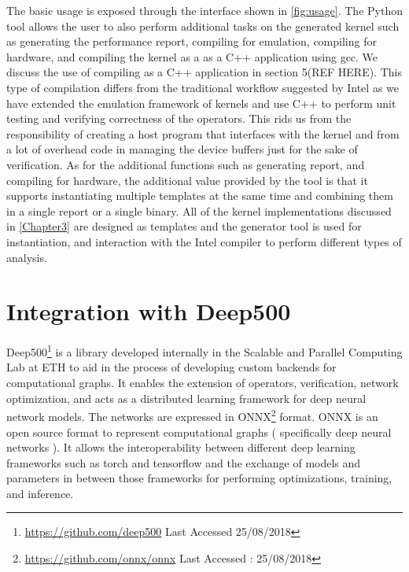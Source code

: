 The basic usage is exposed through the interface shown in \ref{fig:usage}. The Python tool allows the user to also perform additional tasks on the generated kernel such as generating the performance report, compiling for emulation, compiling for hardware, and compiling the kernel as a as a C++ application using gcc. We discuss the use of compiling   as a C++ application in section 5(REF HERE). This type of compilation differs from the traditional workflow suggested by Intel as we have extended the emulation framework of kernels and use C++ to perform unit testing and verifying correctness of the operators. This rids us from the responsibility of creating a host program that interfaces with the kernel and from a lot of overhead code in managing the device buffers just for the sake of verification. 
As for the additional functions such as generating report, and compiling for hardware, the additional value provided by the tool is that it supports instantiating multiple templates at the same time and combining them in a single report or a single binary. All of the kernel implementations discussed in \ref{Chapter3} are designed as templates and the generator tool is used for instantiation, and interaction with the Intel compiler to perform different types of analysis.

\section{Integration with Deep500}

Deep500\footnote{\url{https://github.com/deep500} Last Accessed 25/08/2018} is a library developed internally in the Scalable and Parallel Computing Lab at ETH to aid in the process of developing custom backends for computational graphs. It enables the extension of operators, verification, network optimization, and acts as a distributed learning framework for deep neural network models. The networks are expressed in ONNX\footnote{\url{https://github.com/onnx/onnx} Last Accessed : 25/08/2018 } format. ONNX is an open source format to represent computational graphs ( specifically deep neural networks ). It allows the interoperability between different deep learning frameworks such as torch\cite{torch} and tensorflow\cite{tensorflow} and the exchange of models and parameters in between those frameworks for performing optimizations, training, and inference. 

